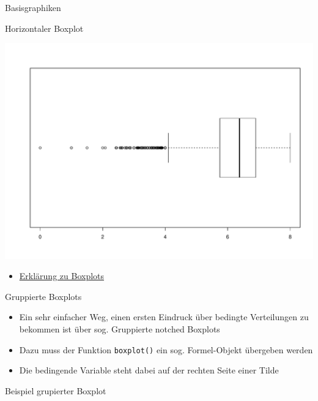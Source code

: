 \documentclass[ignorenonframetext,]{beamer}
\newenvironment{Shaded}{}{}
\newcommand{\KeywordTok}[1]{\textcolor[rgb]{0.00,0.44,0.13}{\textbf{{#1}}}}
\newcommand{\DataTypeTok}[1]{\textcolor[rgb]{0.56,0.13,0.00}{{#1}}}
\newcommand{\OtherTok}[1]{\textcolor[rgb]{0.00,0.44,0.13}{{#1}}}
\newcommand{\NormalTok}[1]{{#1}}
\providecommand{\tightlist}{%
\setlength{\itemsep}{0pt}\setlength{\parskip}{0pt}}
\begin{document}
\begin{frame}[fragile]{Basisgraphiken}
\begin{block}{Horizontaler Boxplot}
\begin{Shaded}
\end{Shaded}

\includegraphics{R_intern_files/figure-beamer/unnamed-chunk-165-1.pdf}

\begin{itemize}
\tightlist
\item
  \href{http://edoc.hu-berlin.de/dissertationen/gruenwald-andreas-2005-01-17/HTML/chapter2.html}{Erklärung
  zu Boxplots}
\end{itemize}

\end{block}

\begin{block}{Gruppierte Boxplots}

\begin{itemize}
\tightlist
\item
  Ein sehr einfacher Weg, einen ersten Eindruck über bedingte
  Verteilungen zu bekommen ist über sog. Gruppierte notched Boxplots
\item
  Dazu muss der Funktion \texttt{boxplot()} ein sog. Formel-Objekt
  übergeben werden
\item
  Die bedingende Variable steht dabei auf der rechten Seite einer Tilde
\end{itemize}

\end{block}

\begin{block}{Beispiel grupierter Boxplot}


\end{block}
\end{frame}
\end{document}
